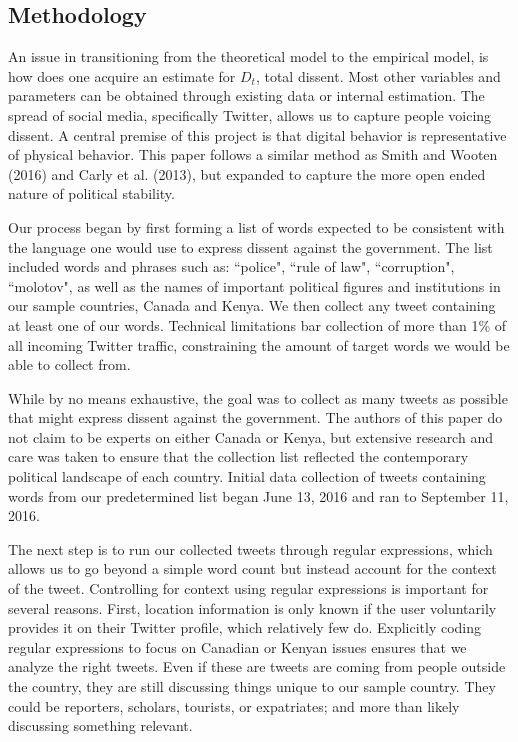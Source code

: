 \documentclass[12pt]{article}
\begin{document}
\begin{spacing}{1.5}
\section*{Methodology}

An issue in transitioning from the theoretical model to the empirical model, is how does one acquire an estimate for $D_t$, total dissent. Most other variables and parameters can be obtained through existing data or internal estimation. The spread of social media, specifically Twitter, allows us to capture people voicing dissent. A central premise of this project is that digital behavior is representative of physical behavior. This paper follows a similar method as Smith and Wooten (2016) and Carly et al. (2013), but expanded to capture the more open ended nature of political stability. 

Our process began by first forming a list of words expected to be consistent with the language one would use to express dissent against the government. The list included words and phrases such as: ``police", ``rule of law", ``corruption", ``molotov", as well as the names of important political figures and institutions in our sample countries, Canada and Kenya. We then collect any tweet containing at least one of our words. Technical limitations bar collection of more than 1\% of all incoming Twitter traffic, constraining the amount of target words we would be able to collect from. 

While by no means exhaustive, the goal was to collect as many tweets as possible that might express dissent against the government. The authors of this paper do not claim to be experts on either Canada or Kenya, but extensive research and care was taken to ensure that the collection list reflected the contemporary political landscape of each country. Initial data collection of tweets containing words from our predetermined list began June 13, 2016 and ran to September 11, 2016. 


The next step is to run our collected tweets through regular expressions, which allows us to go beyond a simple word count but instead account for the context of the tweet. Controlling for context using regular expressions is important for several reasons. First, location information is only known if the user voluntarily provides it on their Twitter profile, which relatively few do. Explicitly coding regular expressions to focus on Canadian or Kenyan issues ensures that we analyze the right tweets. Even if these are tweets are coming from people outside the country, they are still discussing things unique to our sample country. They could be reporters, scholars, tourists, or expatriates; and more than likely discussing something relevant.    


\end{spacing}
\end{document}
